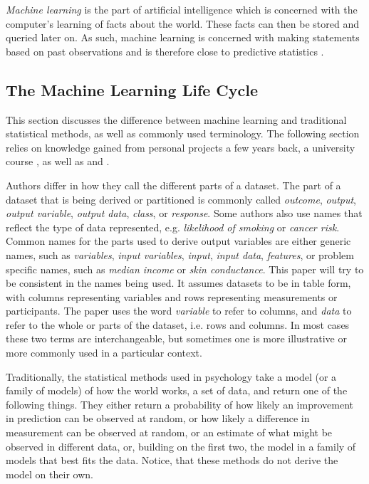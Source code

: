 \documentclass[a4paper,man,12pt,apacite,floatsintext,draftfirst]{apa6} %
\begin{document}
\emph{Machine learning} is the part of artificial intelligence which
is concerned with the computer's learning of facts about the world.
These facts can then be stored and queried later on.
As such, machine learning is concerned with making statements based
on past observations and is therefore close to predictive statistics
\cite{wpML}.

\subsection{The Machine Learning Life Cycle}
This section discusses the difference between machine learning and traditional
statistical methods, as well as commonly used terminology.
The following section relies on knowledge gained from personal projects a few
years back, a university course \cite{psymeth}, as well as 
and .

Authors differ in how they call the different parts of a dataset.
The part of a dataset that is being derived or partitioned is commonly called \emph{outcome},
\emph{output}, \emph{output variable}, \emph{output data}, \emph{class}, or \emph{response}.
Some authors also use names that reflect the type of data represented,
e.g. \emph{likelihood of smoking} or \emph{cancer risk}.
Common names for the parts used to derive output variables are either
generic names, such as \emph{variables}, \emph{input variables}, \emph{input}, \emph{input data}, \emph{features}, or
problem specific names, such as \emph{median income} or \emph{skin conductance}.
This paper will try to be consistent in the names being used.
It assumes datasets
to be in table form, with columns representing variables and rows representing
measurements or participants.
The paper uses the word \emph{variable} to refer to columns, and \emph{data}
to refer to the whole or parts of the dataset, i.e. rows and columns.
In most cases these two terms are interchangeable, but sometimes one is more
illustrative or more commonly used in a particular context.

Traditionally, the statistical methods used in psychology
take a model (or a family of models) of how the world works, a set of data, and return one of
the following things.
They either return a probability of how likely an improvement in prediction
can be observed at random, or how likely a difference in measurement can be
observed at random, or an estimate of what might be observed in different data,
or, building on the first two, the model in a family of models that best fits the data.
Notice, that these methods do not derive the model on their own.
\end{document}
